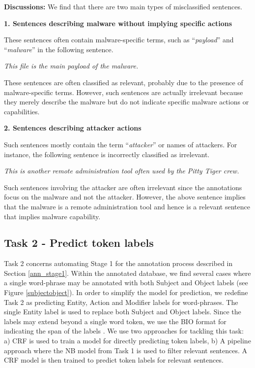 \documentclass[11pt,a4paper]{article}
\begin{document}
\textbf{Discussions:} We find that there are two main types of misclassified sentences.

\textbf{1. Sentences describing malware without implying specific actions}

These sentences often contain malware-specific terms, such as ``\emph{payload}'' and ``\emph{malware}'' in the following sentence.

\vspace{0.3em}

\emph{This file is the main payload of the malware.}

\vspace{0.3em}

These sentences are often classified as relevant, probably due to the presence of malware-specific terms. However, such sentences are actually irrelevant because they merely describe the malware but do not indicate specific malware actions or capabilities.  


\textbf{2. Sentences describing attacker actions}

Such sentences mostly contain the term ``\emph{attacker}'' or names of attackers. For instance, the following sentence is incorrectly classified as irrelevant.

\vspace{0.3em}

\emph{This is another remote administration tool often used by the Pitty Tiger crew.}

\vspace{0.3em}

Such sentences involving the attacker are often irrelevant since the annotations focus on the malware and not the attacker. However, the above sentence implies that the malware is a remote administration tool and hence is a relevant sentence that implies malware capability.


\subsection{Task 2 - Predict token labels}

Task 2 concerns automating Stage 1 for the annotation process described in Section \ref{ann_stage1}. Within the annotated database, we find several cases where a single word-phrase may be annotated with both Subject and Object labels (see Figure \ref{subjectobject}). In order to simplify the model for prediction, we redefine Task 2 as predicting Entity, Action and Modifier labels for word-phrases. The single Entity label is used to replace both Subject and Object labels. Since the labels may extend beyond a single word token, we use the BIO format for indicating the span of the labels \cite{sang1999}. We use two approaches for tackling this task: a) CRF is used to train a model for directly predicting token labels, b) A pipeline approach where the NB model from Task 1 is used to filter relevant sentences. A CRF model is then trained to predict token labels for relevant sentences.
\end{document}
